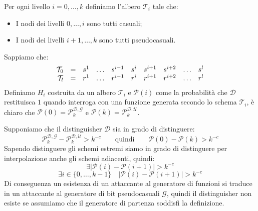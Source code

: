 Per ogni livello $i= 0, \dots, k$ definiamo l'albero $\mathcal{T}_i$ tale che:
\begin{itemize}
  \item I nodi dei livelli $0, \dots, i$ sono tutti casuali;
  \item I nodi dei livelli $i+1, \dots, k$ sono tutti pseudocasuali.
\end{itemize}
Sappiamo che:
\begin{align*}
  \begin{array}{r c lllllllll}
  \mathcal{T}_0 & = & s^1 &\dots &s^{i-1} & s^i &s^{i+1} & s^{i+2} &\dots &s^l \\
  \mathcal{T}_{l}& = & r^1 &\dots &r^{i-1} & r^i &r^{i+1} & r^{i+2} &\dots &r^l \\
  \end{array}
\end{align*}
Definiamo $H_i$ costruita da un albero $\mathcal{T}_i$ e $\mathcal{P}(i)$ 
come la probabilità che $\mathcal{D}$ restituisca $1$ quando interroga
con una funzione generata secondo lo schema $\mathcal{T}_i$, è chiaro che
$\mathcal{P}(0) = \mathcal{P}_k^{\mathcal{D}, \mathcal{G}}$ e
$\mathcal{P}(k) = \mathcal{P}_k^{\mathcal{D}, \mathcal{U}}$.

Supponiamo che il distinguisher $\mathcal{D}$ sia in grado di distinguere:
\[
  \mathcal{P}_k^{\mathcal{D}, \mathcal{G}} - \mathcal{P}_k^{\mathcal{D}, \mathcal{U}} > k^{-c}
  \qquad\text{quindi}\qquad
  \mathcal{P}(0) - \mathcal{P}(k) > k^{-c}
\]
Sapendo distinguere gli schemi estremi siamo in grado di distinguere per interpolazione 
anche gli schemi adiacenti, quindi:
\[
  \exists \big| \mathcal{P}(i) - \mathcal{P}(i+1) \big| > k^{-c}
\]
\[
  \exists i \in \{0, \dots, k-1\} \quad \big| \mathcal{P}(i) - \mathcal{P}(i+1) \big| > k^{-c}
\]
Di conseguenza un esistenza di un attaccante al generatore di funzioni si traduce 
in un attaccante al generatore di bit pseudocasuali $\mathcal{G}$, quindi 
il distinguisher non esiste se assumiamo  che il generatore di partenza soddisfi 
la definizione.